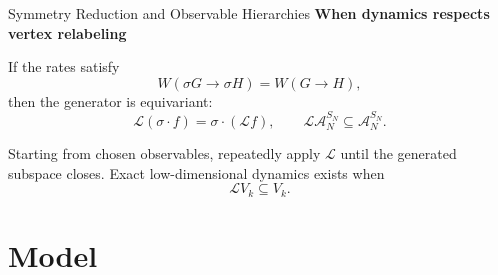 \documentclass[11pt]{beamer}
\newcommand{\eyebrow}[1]{%
  {\color{accent}\bfseries #1}\par
  \vspace{0.04cm}{\color{lightgray}\rule{\linewidth}{0.45pt}}\vspace{0.10cm}}
\begin{document}
\begin{frame}{Symmetry Reduction and Observable Hierarchies}
  \small
  \eyebrow{When dynamics respects vertex relabeling}

  If the rates satisfy
  \[
    W(\sigma G\to\sigma H)=W(G\to H),
  \]
  then the generator is equivariant:
  \[
    \mathcal L(\sigma\!\cdot\!f)
    =\sigma\!\cdot\!(\mathcal Lf),
    \qquad
    \mathcal L\mathcal A_N^{S_N}\subseteq\mathcal A_N^{S_N}.
  \]

  \begin{center}
  \end{center}

  Starting from chosen observables, repeatedly apply $\mathcal L$ until the generated subspace closes. Exact low-dimensional dynamics exists when
  \[
    \mathcal LV_k\subseteq V_k.
  \]
\end{frame}

\section{ Model}
\end{document}
